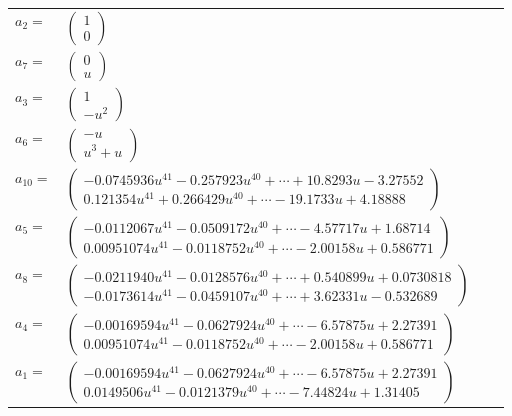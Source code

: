 \documentclass[1p]{elsarticle_modified}
\theoremstyle{definition}
\begin{document}
\begin{tabular}{m{7pt} m{180pt} m{7pt} m{180pt} }
\flushright $a_{2}=$&$\begin{pmatrix}1\\0\end{pmatrix}$ \\
\flushright $a_{7}=$&$\begin{pmatrix}0\\u\end{pmatrix}$ \\
\flushright $a_{3}=$&$\begin{pmatrix}1\\- u^2\end{pmatrix}$ \\
\flushright $a_{6}=$&$\begin{pmatrix}- u\\u^3+u\end{pmatrix}$ \\
\flushright $a_{10}=$&$\begin{pmatrix}-0.0745936 u^{41}-0.257923 u^{40}+\cdots+10.8293 u-3.27552\\0.121354 u^{41}+0.266429 u^{40}+\cdots-19.1733 u+4.18888\end{pmatrix}$ \\
\flushright $a_{5}=$&$\begin{pmatrix}-0.0112067 u^{41}-0.0509172 u^{40}+\cdots-4.57717 u+1.68714\\0.00951074 u^{41}-0.0118752 u^{40}+\cdots-2.00158 u+0.586771\end{pmatrix}$ \\
\flushright $a_{8}=$&$\begin{pmatrix}-0.0211940 u^{41}-0.0128576 u^{40}+\cdots+0.540899 u+0.0730818\\-0.0173614 u^{41}-0.0459107 u^{40}+\cdots+3.62331 u-0.532689\end{pmatrix}$ \\
\flushright $a_{4}=$&$\begin{pmatrix}-0.00169594 u^{41}-0.0627924 u^{40}+\cdots-6.57875 u+2.27391\\0.00951074 u^{41}-0.0118752 u^{40}+\cdots-2.00158 u+0.586771\end{pmatrix}$ \\
\flushright $a_{1}=$&$\begin{pmatrix}-0.00169594 u^{41}-0.0627924 u^{40}+\cdots-6.57875 u+2.27391\\0.0149506 u^{41}-0.0121379 u^{40}+\cdots-7.44824 u+1.31405\end{pmatrix}$ \\

\end{tabular}
\end{document}
